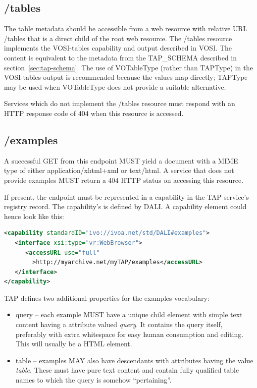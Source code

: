 \documentclass[11pt,letter]{ivoa}
\newcommand{\tapschema}{TAP\_SCHEMA}
\newcommand{\tapschema}{\mbox{%
  \relsize{-0.5}TAP\discretionary{-}{}{\kern-2pt\_}SCHEMA}}
\begin{document}
\subsection{/tables}
\label{sec:vosi-tables}

The table metadata should be accessible from a web resource with relative URL 
/tables that is a direct child of the root web resource. The /tables resource 
implements the VOSI-tables capability and output described in VOSI.
The content is equivalent to the metadata from the 
\tapschema{} described in section~\ref{sec:tap-schema}. The use of VOTableType 
(rather than TAPType) in the VOSI-tables output  is recommended because the values 
map directly; TAPType may be used when VOTableType does not provide a suitable
alternative.

Services which do not implement the /tables resource must respond with an HTTP 
response code of 404 when this resource is accessed.

\subsection{/examples}
\label{sec:dali-examples}

A successful GET from this endpoint MUST yield a document with a MIME type of either 
application/xhtml+xml or text/html. A service that does not provide examples 
MUST return a 404 HTTP status on accessing this resource.

If present, the endpoint must be represented in a capability in the TAP 
service's registry record. The capability's  is defined by
DALI. A capability element could hence look like this:

\begin{lstlisting}[language=XML,basicstyle=\footnotesize]
<capability standardID="ivo://ivoa.net/std/DALI#examples">
   <interface xsi:type="vr:WebBrowser">
      <accessURL use="full"
        >http://myarchive.net/myTAP/examples</accessURL>
   </interface>
</capability>
\end{lstlisting}

TAP defines two additional properties for the examples vocabulary:

\begin{itemize}
\item query -- each example MUST have a unique child element with simple text 
content having a  attribute valued {\em query}. It contains the query itself, 
preferably with extra whitespace for easy human consumption and editing. This 
will usually be a HTML  element.
    
\item table -- examples MAY also have descendants with  attributes having 
the value {\em table}. These must have pure text content and contain fully qualified 
table names to which the query is somehow ``pertaining''.
\end{itemize}
\end{document}
